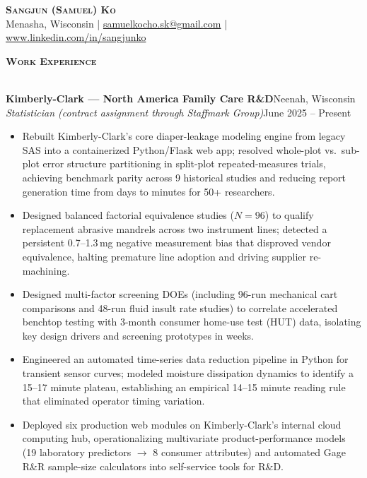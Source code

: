 \documentclass[a4paper]{article}
\newcommand{\lineunder}{
    \vspace*{-8pt} \\
    \hspace*{-18pt} \hrulefill \\
}
\newcommand{\header}[1]{
    \Needspace{4\baselineskip}
    {\hspace*{-18pt}\vspace*{5pt} \textsc{#1}}
    \vspace*{-6pt} \lineunder
}
\newcommand{\role}[4]{
    \Needspace{7\baselineskip}
    \vspace{2pt}
    \textbf{#1}\hfill #2\\
    \textit{#3}\hfill #4\\[-3pt]
}
\begin{document}
\vspace*{-40pt}

\vspace*{-10pt}
\begin{center}
    {\Huge \scshape \textbf{Sangjun (Samuel) Ko}}\\
    Menasha, Wisconsin
    | \href{mailto:samuelkocho.sk@gmail.com}{samuelkocho.sk@gmail.com}
    | \href{https://www.linkedin.com/in/sangjunko}{www.linkedin.com/in/sangjunko}
\end{center}
\vspace*{-8pt}

\header{\textbf{Work Experience}}
\vspace{1mm}

\role{Kimberly-Clark --- North America Family Care R\&D}{Neenah, Wisconsin}
{Statistician (contract assignment through Staffmark Group)}{June 2025 -- Present}
\begin{itemize}[noitemsep]
  \item Rebuilt Kimberly-Clark's core diaper-leakage modeling engine from legacy SAS into a containerized Python/Flask web app; resolved whole-plot vs.\ sub-plot error structure partitioning in split-plot repeated-measures trials, achieving benchmark parity across 9 historical studies and reducing report generation time from days to minutes for 50+ researchers.
  \item Designed balanced factorial equivalence studies ($N=96$) to qualify replacement abrasive mandrels across two instrument lines; detected a persistent 0.7--1.3\,mg negative measurement bias that disproved vendor equivalence, halting premature line adoption and driving supplier re-machining.
  \item Designed multi-factor screening DOEs (including 96-run mechanical cart comparisons and 48-run fluid insult rate studies) to correlate accelerated benchtop testing with 3-month consumer home-use test (HUT) data, isolating key design drivers and screening prototypes in weeks.
  \item Engineered an automated time-series data reduction pipeline in Python for transient sensor curves; modeled moisture dissipation dynamics to identify a 15--17 minute plateau, establishing an empirical 14--15 minute reading rule that eliminated operator timing variation.
  \item Deployed six production web modules on Kimberly-Clark's internal cloud computing hub, operationalizing multivariate product-performance models (19 laboratory predictors $\to$ 8 consumer attributes) and automated Gage R\&R sample-size calculators into self-service tools for R\&D.
\end{itemize}
\end{document}
